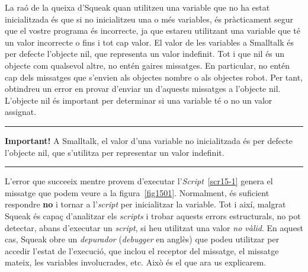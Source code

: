 
La raó de la queixa d'Squeak quan utilitzeu una variable que no ha estat inicialitzada és que si no inicialitzeu una o més variables, és pràcticament segur que el vostre programa és incorrecte, ja que estareu utilitzant una variable que té un valor incorrecte o fins i tot cap valor. El valor de les variables a Smalltalk és per defecte l'objecte \textsf{nil}, que representa un valor indefinit. Tot i que \textsf{nil} és un objecte com qualsevol altre, no entén gaires missatges. En particular, no entén cap dels missatges que s'envien als objectes nombre o als objectes robot. Per tant, obtindreu un error en provar d'enviar un d'aquests missatges a l'objecte \textsf{nil}. L'objecte \textsf{nil} és important per determinar si una variable té o no un valor assignat.

\newpage

\noindent
\rule{\textwidth}{2pt}
\noindent
\textbf{Important!} A Smalltalk, el valor d'una variable no inicialitzada és per defecte l'objecte \textsf{nil}, que s'utilitza per representar un valor indefinit.\\
\noindent
\rule{\textwidth}{2pt}
\vspace*{1mm}

L'error que succeeix mentre provem d'executar l'\emph{Script}~\ref{scr15-1} genera el missatge que podem veure a la figura~\ref{fig1501}. Normalment, és suficient respondre \textbf{no} i tornar a l'\emph{script} per inicialitzar la variable. Tot i així, malgrat Squeak és capaç d'analitzar els \emph{scripts} i trobar aquests errors estructurals, no pot detectar, abans d'executar un \emph{script}, si heu utilitzat una valor  \emph{no vàlid}. En aquest cas, Squeak obre un \emph{depurador} (\emph{debugger} en anglès) que podeu utilitzar per accedir l'estat de l'execució, que inclou el receptor del missatge, el missatge mateix, les variables involucrades, etc. Això és el que ara us explicarem.   

